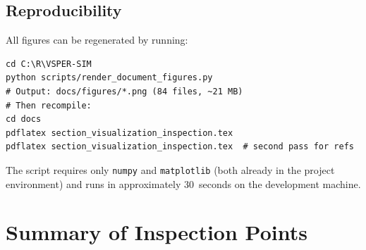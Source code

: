 \documentclass[11pt,a4paper]{article}
\begin{document}
\subsection{Reproducibility}

All figures can be regenerated by running:

\begin{lstlisting}[title={\textbf{Regenerate all document figures}}]
cd C:\R\VSPER-SIM
python scripts/render_document_figures.py
# Output: docs/figures/*.png (84 files, ~21 MB)
# Then recompile:
cd docs
pdflatex section_visualization_inspection.tex
pdflatex section_visualization_inspection.tex  # second pass for refs
\end{lstlisting}

The script requires only \texttt{numpy} and \texttt{matplotlib}
(both already in the project environment) and runs in approximately
30~seconds on the development machine.

\section{Summary of Inspection Points}
\label{sec:summary}
\end{document}
